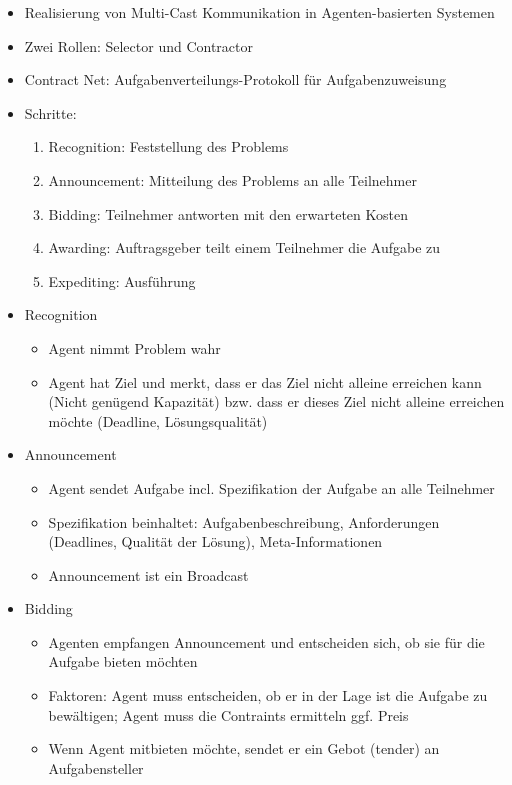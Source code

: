 \documentclass{article} %
\begin{document}
	\begin{itemize}
		\item Realisierung von Multi-Cast Kommunikation in Agenten-basierten Systemen
		\item Zwei Rollen: Selector und Contractor
		\item Contract Net: Aufgabenverteilungs-Protokoll für Aufgabenzuweisung
		\item Schritte:
		\begin{enumerate}
			\item Recognition: Feststellung des Problems
			\item Announcement: Mitteilung des Problems an alle Teilnehmer
			\item Bidding: Teilnehmer antworten mit den erwarteten Kosten
			\item Awarding: Auftragsgeber teilt einem Teilnehmer die Aufgabe zu
			\item Expediting: Ausführung
		\end{enumerate}
		\item Recognition
		\begin{itemize}
			\item Agent nimmt Problem wahr
			\item Agent hat Ziel und merkt, dass er das Ziel nicht alleine erreichen kann (Nicht genügend Kapazität) bzw. dass er dieses Ziel nicht alleine erreichen möchte (Deadline, Lösungsqualität)
		\end{itemize}
		\item Announcement
		\begin{itemize}
			\item Agent sendet Aufgabe incl. Spezifikation der Aufgabe an alle Teilnehmer
			\item Spezifikation beinhaltet: Aufgabenbeschreibung, Anforderungen (Deadlines, Qualität der Lösung), Meta-Informationen
			\item Announcement ist ein Broadcast
		\end{itemize}
		\item Bidding
		\begin{itemize}
			\item Agenten empfangen Announcement und entscheiden sich, ob sie für die Aufgabe bieten möchten
			\item Faktoren: Agent muss entscheiden, ob er in der Lage ist die Aufgabe zu bewältigen; Agent muss die Contraints ermitteln ggf. Preis
			\item Wenn Agent mitbieten möchte, sendet er ein Gebot (tender) an Aufgabensteller

\end{itemize}
\end{itemize}
\end{document}
